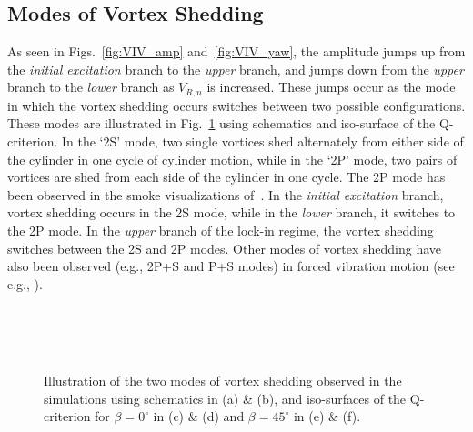 \subsection{Modes of Vortex Shedding}
\label{sec:VIVmodes}
%
As seen in Figs.~\ref{fig:VIV_amp} and~\ref{fig:VIV_yaw}, the amplitude jumps
up from the {\em initial excitation} branch to the {\em upper} branch, and
jumps down from the {\em upper} branch to the {\em lower} branch as $V_{R,n}$
is increased. These jumps occur as the mode in which the vortex shedding occurs
switches between two possible configurations. These modes are illustrated in
Fig.~\ref{fig:VIV_Q} using schematics and iso-surface of the Q-criterion.  In
the `2S' mode, two single vortices shed alternately from either side of the
cylinder in one cycle of cylinder motion, while in the `2P' mode, two pairs of
vortices are shed from each side of the cylinder in one cycle.  The 2P mode has
been observed in the smoke visualizations of~\citet{brika1993vortex}.  In the
{\em initial excitation} branch, vortex shedding occurs in the 2S mode, while
in the {\em lower} branch, it switches to the 2P mode. In the {\em upper}
branch of the lock-in regime, the vortex shedding switches between the 2S and
2P modes. Other modes of vortex shedding have also been observed (e.g., 2P+S
and P+S modes) in forced vibration motion (see e.g.,
\cite{williamson1988vortex}). 
%
\begin{figure}[htb!]
   \qquad
   \\
%
   \qquad
   \\
%
   \qquad
   \\
    \caption{Illustration of the two modes of vortex shedding observed in the
    simulations using schematics in (a) \& (b), and iso-surfaces of the
    Q-criterion for $\beta=0^\circ$ in (c) \& (d) and $\beta=45^\circ$ in (e) \&
    (f).}
  \label{fig:VIV_Q}
\end{figure}
%
